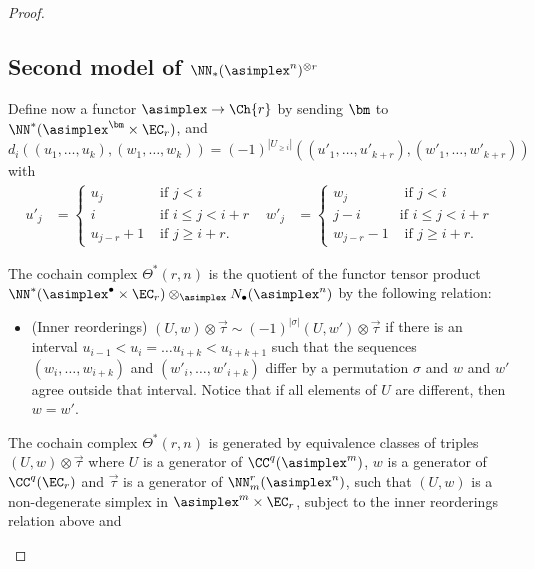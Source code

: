 \begin{proof}
\subsection{Second model of $\NN_*(\asimplex^n)^{\otimes r}$} Define now a functor $\asimplex\to \Ch{r}$ by sending $\bm$ to $\NN^*(\asimplex^{\bm}\times \EC_r)$, and 
\[d_i((u_1,\ldots,u_k), (w_1,\ldots,w_k)) = (-1)^{|U_{\geq i}|}((u'_1,\ldots,u'_{k+r}),(w'_1,\ldots,w'_{k+r}))\] with
\begin{align}\label{eq:Theta}
    u'_j &= 
        \begin{cases} 
            u_j &\text{ if $j<i$} \\ 
            i & \text{ if $i\leq j < i+r$} \\ 
            u_{j-r} + 1 & \text{ if $j\geq i+r$.}
        \end{cases} 
        &
	w'_j &= 
        \begin{cases} 
            w_j &\text{ if $j<i$} \\
            j-i & \text{if $i\leq j<i+r$} \\ 
            w_{j-r} - 1 & \text{ if $j\geq i+r$.}
        \end{cases}
\end{align}
\begin{definition} The cochain complex $\Theta^*(r,n)$ is the quotient of the functor tensor product $\NN^*(\asimplex^\bullet\times \EC_r)\otimes_{\asimplex}
N_\bullet(\asimplex^n)$
by the following relation:
\begin{itemize}
    	\item (Inner reorderings) $(U,w)\otimes \vec{\tau}\sim (-1)^{|\sigma|}(U,w')\otimes \vec{\tau}$ if there is an interval $u_{i-1}<u_i =\ldots u_{i+k}<u_{i+k+1}$ such that the sequences $(w_i,\ldots,w_{i+k})$ and $(w'_i,\ldots,w'_{i+k})$ differ by a permutation $\sigma$ and $w$ and $w'$ agree outside that interval. Notice that if all elements of $U$ are different, then $w=w'$.
\end{itemize}
\end{definition}
 The cochain complex $\Theta^*(r,n)$ is generated by equivalence classes of triples $(U,w)\otimes \vec{\tau}$ where $U$ is a generator of $\CC^q(\asimplex^m)$, $w$ is a generator of $\CC^q(\EC_r)$ and $\vec{\tau}$ is a generator of $\NN_m^r(\asimplex^n)$, such that $(U,w)$ is a non-degenerate simplex in $\asimplex^m\times \EC_r$,
subject to the inner reorderings relation above and 
\begin{itemize}

\end{itemize}
\end{proof}
